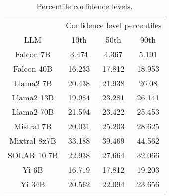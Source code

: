 \begin{table*}
\centering
\begin{tabular}{c|c|c|c}
& \multicolumn{3}{c}{Confidence level percentiles} \\ 
LLM & 10th & 50th & 90th\\ \hline
Falcon 7B & 3.474 & 4.367 & 5.191\\
Falcon 40B & 16.233 & 17.812 & 18.953\\
Llama2 7B & 20.438 & 21.938 & 26.08\\
Llama2 13B & 19.984 & 23.281 & 26.141\\
Llama2 70B & 21.594 & 23.422 & 25.453\\
Mistral 7B & 20.031 & 25.203 & 28.625\\
Mixtral 8x7B & 33.188 & 39.469 & 44.562\\
SOLAR 10.7B & 22.938 & 27.664 & 32.066\\
Yi 6B & 16.719 & 17.812 & 19.203\\
Yi 34B & 20.562 & 22.094 & 23.656\\
\hline
\end{tabular}
\caption{Percentile confidence levels.}
\label{tab:percentile_conf}
\end{table*}
